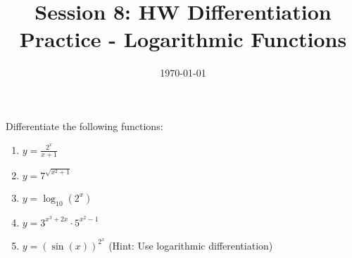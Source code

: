 \documentclass{article}
\begin{document}
\title{Session 8: HW Differentiation Practice - Logarithmic Functions}
\date{\today}
\maketitle

Differentiate the following functions:

\begin{enumerate}
\item $y = \frac{2^x}{x + 1}$
\item $y = 7^{\sqrt{x^2 + 1}}$
\item $y = \log_{10}(2^x)$
\item $y = 3^{x^3 + 2x} \cdot 5^{x^2 - 1}$
\item $y = (\sin(x))^{2^x}$ (Hint: Use logarithmic differentiation)
\end{enumerate}
\end{document}
